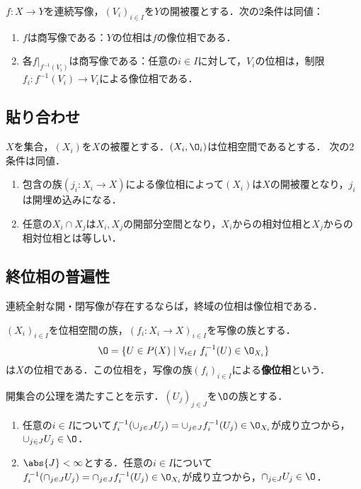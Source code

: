 \documentclass[uplatex,dvipdfmx]{jsreport}
\begin{document}
\begin{proposition}[商写像の開被覆による特徴付け]
    $f:X\to Y$を連続写像，$(V_i)_{i\in I}$を$Y$の開被覆とする．次の2条件は同値：
    \begin{enumerate}
        \item $f$は商写像である：$Y$の位相は$f$の像位相である．
        \item 各$f|_{f^{-1}(V_i)}$は商写像である：任意の$i\in I$に対して，$V_i$の位相は，制限$f_i:f^{-1}(V_i)\to V_i$による像位相である．
    \end{enumerate}
\end{proposition}

\subsection{貼り合わせ}

\begin{theorem}[位相の族の貼り合わせの条件]
    $X$を集合，$(X_i)$を$X$の被覆とする．$(X_i,\O_i)$は位相空間であるとする．
    次の2条件は同値．
    \begin{enumerate}
        \item 包含の族$(j_i:X_i\to X)$による像位相によって$(X_i)$は$X$の開被覆となり，$j_i$は開埋め込みになる．
        \item 任意の$X_i\cap X_j$は$X_i,X_j$の開部分空間となり，$X_i$からの相対位相と$X_j$からの相対位相とは等しい．
    \end{enumerate}
\end{theorem}

\subsection{終位相の普遍性}

\begin{tcolorbox}[colframe=ForestGreen, colback=ForestGreen!10!white,breakable,colbacktitle=ForestGreen!40!white,coltitle=black,fonttitle=\bfseries\sffamily,
title=]
    連続全射な開・閉写像が存在するならば，終域の位相は像位相である．
\end{tcolorbox}

\begin{proposition}[像位相の特徴付け]
    $(X_i)_{i\in I}$を位相空間の族，$(f_i:X_i\to X)_{i\in I}$を写像の族とする．
    \[ \O=\{U\in P(X)\mid \forall_{i\in I}\; f^{-1}_i(U)\in\O_{X_i}\} \]
    は$X$の位相である．この位相を，写像の族$(f_i)_{i\in I}$による\textbf{像位相}という．
\end{proposition}
\begin{Proof}
    開集合の公理を満たすことを示す．$(U_j)_{j\in J}$を$\O$の族とする．
    \begin{enumerate}
        \item 任意の$i\in I$について$f^{-1}_i(\cup_{j\in J}U_j)=\cup_{j\in J}f^{-1}_i(U_j)\in\O_{X_i}$が成り立つから，$\cup_{j\in J}U_j\in\O$．
        \item $\abs{J}<\infty$とする．任意の$i\in I$について$f^{-1}_i(\cap_{j\in J}U_j)=\cap_{j\in J}f^{-1}_i(U_j)\in\O_{X_i}$が成り立つから，$\cap_{j\in J}U_j\in\O$．
    \end{enumerate}
\end{Proof}
\end{document}
